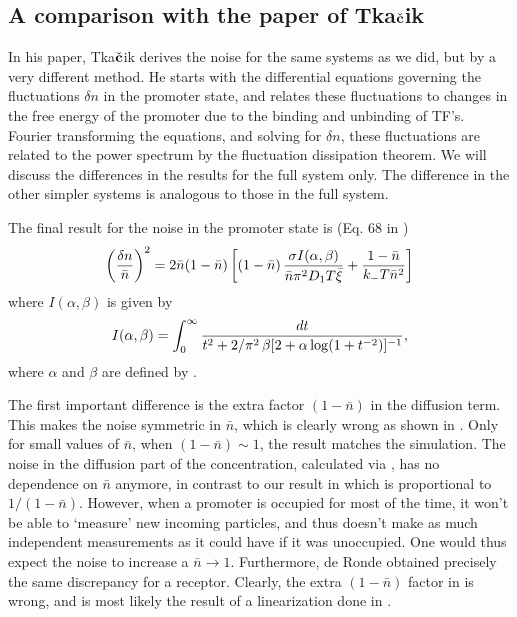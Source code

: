 \subsection{A comparison with the paper of Tka$\check{\bf c}$ik \cite{Tkacik2009}}
In his paper, Tka$\check{\bf c}$ik derives the noise for the same systems as we did, but by a very different method. He starts with the differential equations governing the fluctuations $\delta n$ in the promoter state, and relates these fluctuations to changes in the free energy of the promoter due to the binding and unbinding of TF's. Fourier transforming the equations, and solving for $\delta n$, these fluctuations are related to the power spectrum by the fluctuation dissipation theorem. We will discuss the differences in the results for the full system only. The difference in the other simpler systems is analogous to those in the full system. 

The final result for the noise in the promoter state is (Eq. 68 in \cite{Tkacik2009}) 
\begin{equation}
 \elabel{NoiseProTka}
 \left( \frac{\delta n}{\bar{n}} \right)^2 = 2 \bar{n}(1-\bar{n})\left[ (1 -\bar{n}) \, \frac{\sigma I(\alpha,\beta)}{\bar{n} \pi^2 D_1 T \bar{\xi}} + \frac{1-\bar{n}}{k_- T \bar{n}^2} \right]
\end{equation}
where $I(\alpha,\beta)$ is given by
\begin{equation}
 \elabel{IntProTka}
 I(\alpha,\beta) = \int_0^{\infty} \frac{dt}{t^2 + 2/\pi^{2} \, \beta[2 + \alpha \, {\rm log}(1 + t^{-2})]^{-1}},
\end{equation}
where $\alpha$ and $\beta$ are defined by . 

The first important difference is the extra factor $(1-\bar{n})$ in the diffusion term. This makes the noise symmetric in $\bar{n}$, which is clearly wrong as shown in . Only for small values of $\bar{n}$, when $(1-\bar{n})\sim 1$, the result matches the simulation. The noise in the diffusion part of the concentration, calculated via , has no dependence on $\bar{n}$ anymore, in contrast to our result in  which is proportional to $1/(1-\bar{n})$. However, when a promoter is occupied for most of the time, it won't be able to `measure' new incoming particles, and thus doesn't make as much independent measurements as it could have if it was unoccupied. One would thus expect the noise to increase a $\bar{n}\to1$. Furthermore, de Ronde \cite{DeRonde2012} obtained precisely the same discrepancy for a receptor. Clearly, the extra $(1-\bar{n})$ factor in  is wrong, and is most likely the result of a linearization done in \cite{Tkacik2009}. 


